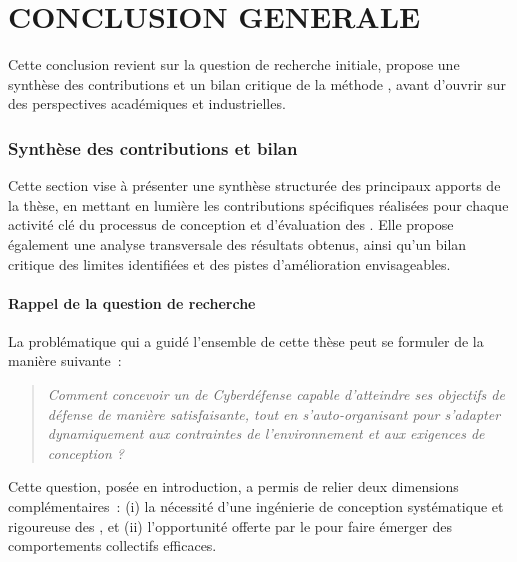 \clearpage
\thispagestyle{empty}
\null
\newpage

\cleardoublepage
{}
\part*{CONCLUSION GENERALE}
\label{part:conclusion}

\clearpage
\thispagestyle{empty}
\null
\newpage


\noindent
Cette conclusion revient sur la question de recherche initiale, propose une synthèse des contributions et un bilan critique de la méthode , avant d'ouvrir sur des perspectives académiques et industrielles.

\section*{Synthèse des contributions et bilan}
\label{sec:synthese_bilan}

\noindent
Cette section vise à présenter une synthèse structurée des principaux apports de la thèse, en mettant en lumière les contributions spécifiques réalisées pour chaque activité clé du processus de conception et d'évaluation des . Elle propose également une analyse transversale des résultats obtenus, ainsi qu'un bilan critique des limites identifiées et des pistes d'amélioration envisageables.

\subsection*{Rappel de la question de recherche}

\noindent
La problématique qui a guidé l'ensemble de cette thèse peut se formuler de la manière suivante~:

\begin{quote}
  \emph{Comment concevoir un  de Cyberdéfense capable d'atteindre ses objectifs de défense de manière satisfaisante, tout en s'auto-organisant pour s'adapter dynamiquement aux contraintes de l'environnement et aux exigences de conception ?}
\end{quote}
\noindent
Cette question, posée en introduction, a permis de relier deux dimensions complémentaires~:
(i) la nécessité d'une ingénierie de conception systématique et rigoureuse des , et
(ii) l'opportunité offerte par le  pour faire émerger des comportements collectifs efficaces.

